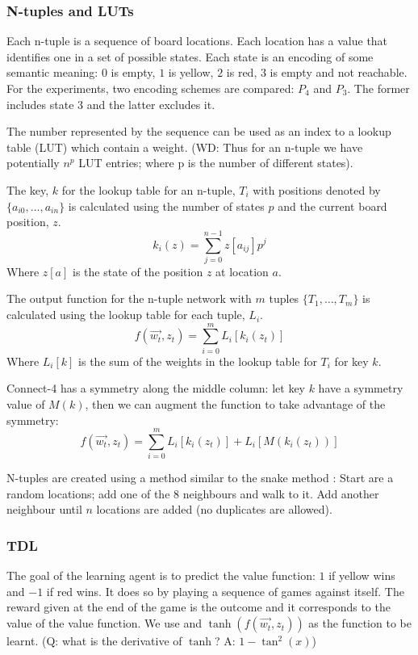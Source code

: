 \subsubsection{N-tuples and LUTs}
Each n-tuple is a sequence of board locations.  Each location has a value that identifies one in a set of possible states.  Each state is an encoding of some semantic meaning: $0$ is empty, $1$ is yellow, $2$ is red, $3$ is empty and not reachable.  For the experiments, two encoding schemes are compared: $P_4$ and $P_3$.  The former includes state $3$ and the latter excludes it. 

The number represented by the sequence can be used as an index to a lookup table (LUT) which contain a weight. (WD: Thus for an n-tuple we have potentially $n^p$ LUT entries; where p is the number of different states). 

The key, $k$ for the lookup table for an n-tuple, $T_i$ with positions denoted by $\{a_{i0},\ldots,a_{in}\}$ is calculated using the number of states $p$ and the current board position, $z$.
\[
 k_i(z) = \sum_{j=0}^{n-1} z[a_{ij}] p^j 
\]
Where $z[a]$ is the state of the position $z$ at location $a$.

The output function for the n-tuple network with $m$ tuples $\{T_1,\ldots,T_m\}$ is calculated using the lookup table for each tuple, $L_i$. 
\[
f(\vec{w_t},z_t) = \sum_{i=0}^{m} L_i[k_i(z_t)]
\]
Where $L_i[k]$ is the sum of the weights in the lookup table for $T_i$ for key $k$.

Connect-4 has a symmetry along the 	middle column: let key $k$ have a symmetry value of $M(k)$, then we can augment the function to take advantage of the symmetry:
\[
f(\vec{w_t},z_t) = \sum_{i=0}^{m} L_i[k_i(z_t)] + L_i[M(k_i(z_t))]
\] 

N-tuples are created using a method similar to the snake method \cite{lucas:tuple}: Start are a random locations; add one of the $8$ neighbours and walk to it.  Add another neighbour until $n$ locations are added (no duplicates are allowed). 
\subsubsection{TDL}
The goal of the learning agent is to predict the value function: $1$ if yellow wins and $-1$ if red wins.  It does so by playing a sequence of games against itself.  The reward given at the end of the game is the outcome and it corresponds to the value of the value function.
We use  and $\tanh(f(\vec{w_t},z_t))$ as the function to be learnt.
(Q: what is the derivative of $\tanh$? A: $1 - \tan^2(x)$) %
